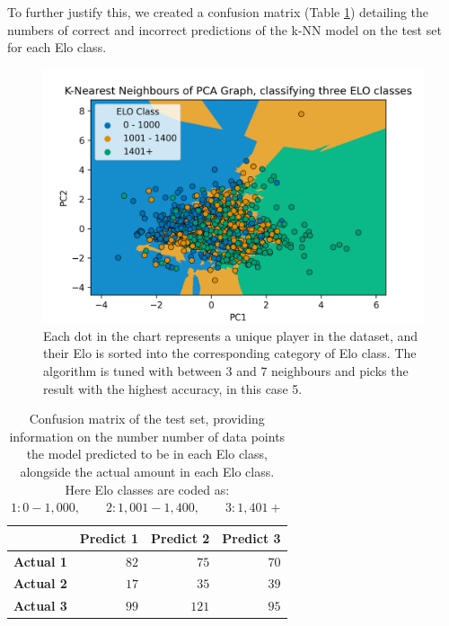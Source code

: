 \documentclass[10pt,a4paper]{article}
\begin{document}
\begin{multicols}{2}
To further justify this, we created a confusion matrix (Table \ref{tab:confusion_matrix}) detailing the numbers of correct and incorrect predictions of the k-NN model on the test set for each Elo class. 
\begin{figure}[t]
  \centering
  \includegraphics[width=\textwidth]{report/images/knn_graph.png}
  \caption{Each dot in the chart represents a unique player in the dataset, and their Elo is sorted into the corresponding category of Elo class. The algorithm is tuned with between 3 and 7 neighbours and picks the result with the highest accuracy, in this case 5.}
  \label{fds-project-template:fig:knn}
\end{figure}

\begin{table}[H]
  \centering
  \caption{Confusion matrix of the test set, providing information on the number number of data points the model predicted to be in each Elo class, alongside the actual amount in each Elo class. Here Elo classes are coded as: $1: 0 - 1,000, \qquad 2: 1,001 - 1,400, \qquad 3: 1,401+$}
  \label{tab:confusion_matrix}
    \begin{tabular}{lrrr}
        \toprule
        &\textbf{Predict 1}&\textbf{Predict 2}&\textbf{Predict 3}\\
        \midrule
        \textbf{Actual 1}&$82$&$ 75$&$70$\tabularnewline
        \textbf{Actual 2}&$17$&$ 35$&$39$\tabularnewline
        \textbf{Actual 3}&$ 99$&$ 121$&$95$\tabularnewline
        \bottomrule
    \end{tabular}
\end{table}


\end{multicols}
\end{document}
